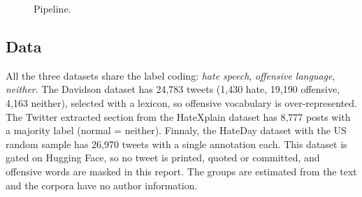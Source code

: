 \documentclass[runningheads,a4paper,oribibl]{llncs}
\begin{document}
\begin{figure}[htbp]
{}
\caption{Pipeline.\label{fig:pipeline}}
\end{figure}

\subsection{Data}
All the three datasets share the label coding: \emph{hate speech}, \emph{offensive language}, \emph{neither}.
The Davidson dataset has 24,783 tweets (1,430 hate, 19,190 offensive, 4,163 neither),
selected with a lexicon, so offensive vocabulary is over-represented.
The Twitter extracted section from the HateXplain dataset has 8,777 posts with a majority label
(normal = neither). Finnaly, the HateDay dataset with the US random sample has 26,970 tweets with
a single annotation each. This dataset is gated on Hugging Face, so no tweet is printed, quoted
or committed, and offensive words are masked in this report. The groups are estimated from the
text and the corpora have no author information.
\end{document}
